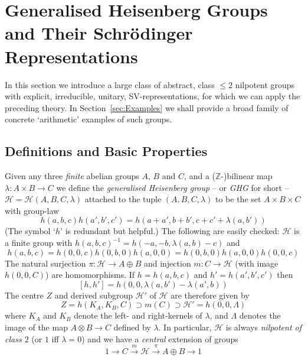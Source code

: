 \documentclass[12pt]{article}
\newcounter{example}[section]
\newcommand{\bbZ}{\ensuremath{\mathbb{Z}}}
\newcommand{\cH}{\ensuremath{\mathcal{H}}}
\newcommand{\inv}{^{-1}}%
\begin{document}
\section{Generalised Heisenberg Groups and Their Schr\"odinger Representations}\label{sec:GHGs and their SRs}
In this section we introduce a large class of abstract, class $\leq 2$ nilpotent groups with explicit, irreducible, unitary, SV-representations, for which we can apply the preceding theory. In Section~\ref{sec:Examples} we shall provide a broad family of concrete `arithmetic' examples of such groups.
\subsection{Definitions and Basic Properties}
Given any three \textit{finite} abelian groups 
 $A$, $B$ and $C$, and a ($\bbZ$-)bilinear map $\lambda:A\times B\rightarrow C$ we define the {\em generalised Heisenberg group} -- or \textit{GHG} for short -- $\cH=\cH(A,B,C,\lambda)$ attached to the tuple $(A,B,C,\lambda)$ to be the set $A\times B\times C$ with group-law   
$$
h(a,b,c)h(a',b',c')=h(a+a', b+b',c+c'+\lambda(a,b') )
$$ 
(The symbol `$h$' is redundant but helpful.) The following are easily checked: $\cH$ is a finite group with $h(a,b,c)\inv=h(-a,-b,\lambda(a,b)-c)$ and
\begin{equation}\label{eq:generators of HABC}
	h(a,b,c)=h(0,0,c)h(0,b,0)h(a,0,0)=h(0,b,0)h(a,0,0)h(0,0,c)
\end{equation}
The natural surjection $\pi:\cH\rightarrow A\oplus{}B$ and injection $m:C\rightarrow \cH$ (with image $h(0,0,C)$)  are homomorphisms. If $h=h(a,b,c)$ and 
$h'=h(a',b',c')$ then 
\begin{equation}\label{eq: commutators in HeiStan}
	[h,h']=h(0,0,\lambda(a,b')-\lambda(a',b))
\end{equation}
The centre $Z$ and derived subgroup $\cH'$ of $\cH$ are therefore given by 
\begin{equation}\label{eq:centre and commutator}
	Z=h(K_A, K_B, C)\supset m(C) \supset  
	\cH'= h(0,0,\Lambda) 
\end{equation}
where $K_A$ and $K_B$ denote the left- and right-kernels of $\lambda$, and $\Lambda$ denotes the image of the map 
$A\otimes{}B\rightarrow C$ defined by $\lambda$. In particular, $\cH$ is always \textit{nilpotent of class $2$} (or $1$ iff $\lambda=0$) and we have a \textit{central} extension of groups
\begin{equation}\label{eq:ses of gps}
	1\rightarrow C\stackrel{m}{\longrightarrow} \cH\stackrel{\pi}
	\longrightarrow 
	A\oplus{}B\rightarrow 1
\end{equation}
\end{document}
